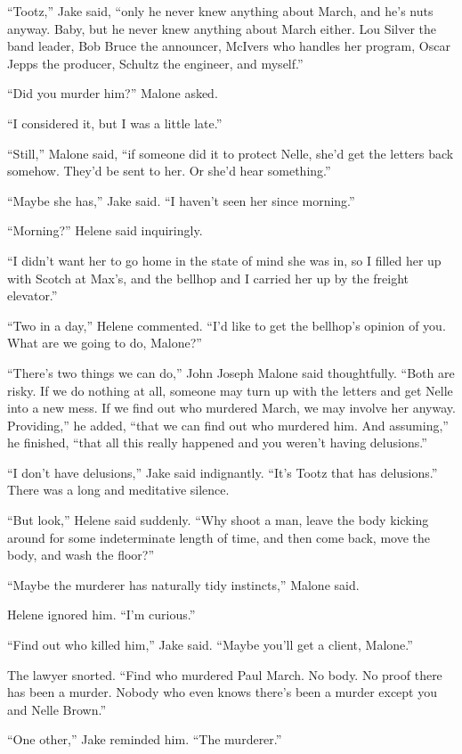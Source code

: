\documentclass{novel}
\begin{document}
“Tootz,” Jake said, “only he never knew anything about March, and he’s nuts anyway. Baby, but he never knew anything about March either. Lou Silver the band leader, Bob Bruce the announcer, McIvers who handles her program, Oscar Jepps the producer, Schultz the engineer, and myself.”

“Did you murder him?” Malone asked.

“I considered it, but I was a little late.”

“Still,” Malone said, “if someone did it to protect Nelle, she’d get the letters back somehow. They’d be sent to her. Or she’d hear something.”

“Maybe she has,” Jake said. “I haven’t seen her since morning.”

“Morning?” Helene said inquiringly.

“I didn’t want her to go home in the state of mind she was in, so I filled her up with Scotch at Max’s, and the bellhop and I carried her up by the freight elevator.”

“Two in a day,” Helene commented. “I’d like to get the bellhop’s opinion of you. What are we going to do, Malone?”

“There’s two things we can do,” John Joseph Malone said thoughtfully. “Both are risky. If we do nothing at all, someone may turn up with the letters and get Nelle into a new mess. If we find out who murdered March, we may involve her anyway. Providing,” he added, “that we can find out who murdered him. And assuming,” he finished, “that all this really happened and you weren’t having delusions.”

“I don’t have delusions,” Jake said indignantly. “It’s Tootz that has delusions.” There was a long and meditative silence.

“But look,” Helene said suddenly. “Why shoot a man, leave the body kicking around for some indeterminate length of time, and then come back, move the body, and wash the floor?”

“Maybe the murderer has naturally tidy instincts,” Malone said.

Helene ignored him. “I’m curious.”

“Find out who killed him,” Jake said. “Maybe you’ll get a client, Malone.”

The lawyer snorted. “Find who murdered Paul March. No body. No proof there has been a murder. Nobody who even knows there’s been a murder except you and Nelle Brown.”

“One other,” Jake reminded him. “The murderer.”
\end{document}
